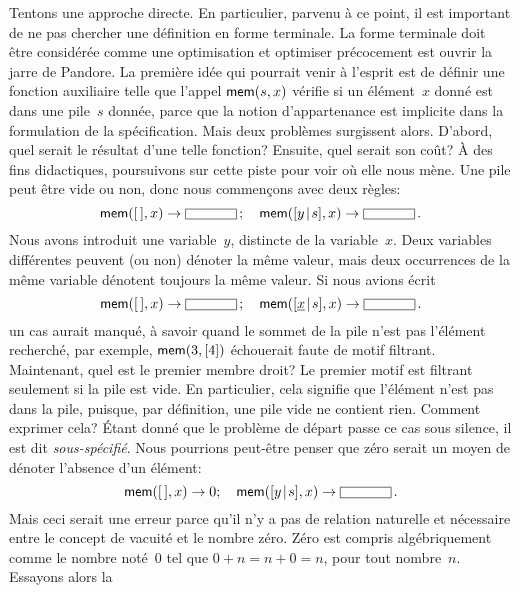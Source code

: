 Tentons une approche directe. En particulier, parvenu à ce point, il
est important de ne pas chercher une définition en forme terminale. La
forme terminale doit être considérée comme une optimisation et
optimiser précocement est ouvrir la jarre de Pandore.  La première
idée qui pourrait venir à l'esprit est de définir une fonction
auxiliaire  telle que l'appel \(\textsf{mem}(s,x)\) vérifie si
un élément~\(x\) donné est dans une pile~\(s\) donnée, parce que la
notion d'appartenance est implicite dans la formulation de la
spécification. Mais deux problèmes surgissent alors. D'abord, quel
serait le résultat d'une telle fonction? Ensuite, quel serait son
coût? À des fins didactiques, poursuivons sur cette piste pour voir où
elle nous mène. Une pile peut être vide ou non, donc nous commençons
avec deux règles:
\begin{equation*}
\fun{mem}(\el,x) \rightarrow \fbcode{CCCCC}\,;\quad
\fun{mem}(\cons{y}{s},x) \rightarrow \fbcode{CCCCC}\,.
\end{equation*}
Nous avons introduit une variable~\(y\), distincte de la
variable~\(x\). Deux variables différentes peuvent (ou non) dénoter la
même valeur, mais deux occurrences de la même variable dénotent
toujours la même valeur. Si nous avions écrit
\begin{equation*}
\fun{mem}(\el,x) \rightarrow \fbcode{CCCCC}\,;\quad
\fun{mem}(\cons{\underline{x}}{s},x) \rightarrow \fbcode{CCCCC}\,.
\end{equation*}
un cas aurait manqué, à savoir quand le sommet de la pile n'est pas
l'élément recherché, par exemple, \(\textsf{mem}(3,[4])\) échouerait
faute de motif filtrant. Maintenant, quel est le premier membre droit?
Le premier motif est filtrant seulement si la pile est vide. En
particulier, cela signifie que l'élément n'est pas dans la pile,
puisque, par définition, une pile vide ne contient rien. Comment
exprimer cela?  Étant donné que le problème de départ passe ce cas
sous silence, il est dit
\emph{sous-spécifié}. Nous pourrions
peut-être penser que zéro serait un moyen de dénoter l'absence d'un
élément:
\begin{equation*}
\fun{mem}(\el,x) \rightarrow 0;\quad
\fun{mem}(\cons{y}{s},x) \rightarrow \fbcode{CCCCC}\,.
\end{equation*}
Mais ceci serait une erreur parce qu'il n'y a pas de relation
naturelle et nécessaire entre le concept de vacuité et le nombre
zéro. Zéro est compris algébriquement comme le nombre noté~\(0\) tel
que \(0 + n = n + 0 = n\), pour tout nombre~\(n\). Essayons alors la
